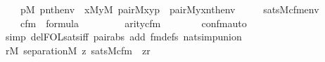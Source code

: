 \begin{isabellebody}
\ \ \ \ {\isacharparenleft}{\kern0pt}{\isasymexists}p{\isasymin}M{\isachardot}{\kern0pt}\ p{\isasymin}nth{\isacharparenleft}{\kern0pt}{}{\isacharcomma}{\kern0pt}env{\isacharparenright}{\kern0pt}\ {\isacharampersand}{\kern0pt}\ {\isacharparenleft}{\kern0pt}{\isasymexists}x{\isasymin}M{\isachardot}{\kern0pt}{\isasymexists}y{\isasymin}M{\isachardot}{\kern0pt}\ pair{\isacharparenleft}{\kern0pt}{\isacharhash}{\kern0pt}{\isacharhash}{\kern0pt}M{\isacharcomma}{\kern0pt}x{\isacharcomma}{\kern0pt}y{\isacharcomma}{\kern0pt}p{\isacharparenright}{\kern0pt}\ {\isacharampersand}{\kern0pt}\ pair{\isacharparenleft}{\kern0pt}{\isacharhash}{\kern0pt}{\isacharhash}{\kern0pt}M{\isacharcomma}{\kern0pt}y{\isacharcomma}{\kern0pt}x{\isacharcomma}{\kern0pt}nth{\isacharparenleft}{\kern0pt}{}{\isacharcomma}{\kern0pt}env{\isacharparenright}{\kern0pt}{\isacharparenright}{\kern0pt}{\isacharparenright}{\kern0pt}{\isacharparenright}{\kern0pt}\isanewline
\ \ \ \ {\isasymlongleftrightarrow}\ sats{\isacharparenleft}{\kern0pt}M{\isacharcomma}{\kern0pt}cfm{\isacharparenleft}{\kern0pt}{}{\isacharcomma}{\kern0pt}{}{\isacharparenright}{\kern0pt}{\isacharcomma}{\kern0pt}env{\isacharparenright}{\kern0pt}{\isachardoublequoteclose}\isanewline
\ \ \ \ \isanewline
\ \ \ \ {\isachardoublequoteopen}cfm{\isacharparenleft}{\kern0pt}{}{\isacharcomma}{\kern0pt}{}{\isacharparenright}{\kern0pt}\ {\isasymin}\ formula{\isachardoublequoteclose}\isanewline
\ \ \ \ \isanewline
\ \ \ \ {\isachardoublequoteopen}arity{\isacharparenleft}{\kern0pt}cfm{\isacharparenleft}{\kern0pt}{}{\isacharcomma}{\kern0pt}{}{\isacharparenright}{\kern0pt}{\isacharparenright}{\kern0pt}\ {\isacharequal}{\kern0pt}\ {}{\isachardoublequoteclose}\isanewline
\ \ \ \ \isamarkupfalse%
\ con{\isacharunderscore}{\kern0pt}fm{\isacharunderscore}{\kern0pt}auto\ \isamarkupfalse%
\ {\isacharparenleft}{\kern0pt}simp\ del{\isacharcolon}{\kern0pt}FOL{\isacharunderscore}{\kern0pt}sats{\isacharunderscore}{\kern0pt}iff\ pair{\isacharunderscore}{\kern0pt}abs\ add{\isacharcolon}{\kern0pt}\ fm{\isacharunderscore}{\kern0pt}defs\ nat{\isacharunderscore}{\kern0pt}simp{\isacharunderscore}{\kern0pt}union{\isacharparenright}{\kern0pt}\isanewline
\ \ \isamarkupfalse%
\isanewline
\ \ \isamarkupfalse%
\ {\isachardoublequoteopen}{\isasymforall}r{\isasymin}M{\isachardot}{\kern0pt}\ separation{\isacharparenleft}{\kern0pt}{\isacharhash}{\kern0pt}{\isacharhash}{\kern0pt}M{\isacharcomma}{\kern0pt}\ {\isasymlambda}z{\isachardot}{\kern0pt}\ sats{\isacharparenleft}{\kern0pt}M{\isacharcomma}{\kern0pt}cfm{\isacharparenleft}{\kern0pt}{}{\isacharcomma}{\kern0pt}{}{\isacharparenright}{\kern0pt}\ {\isacharcomma}{\kern0pt}\ {\isacharbrackleft}{\kern0pt}z{\isacharcomma}{\kern0pt}r{\isacharbrackright}{\kern0pt}{\isacharparenright}{\kern0pt}{\isacharparenright}{\kern0pt}{\isachardoublequoteclose}\isanewline

\end{isabellebody}
